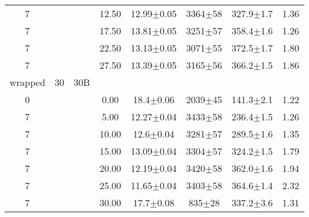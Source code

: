 \begin{tabular}{ccccccc}
7
 &  &  &      12.50 &   12.99$\pm$0.05 &  3364$\pm$58 &  327.9$\pm$1.7 &        1.36 \\
7
 &  &  &      17.50 &   13.81$\pm$0.05 &  3251$\pm$57 &  358.4$\pm$1.6 &        1.26 \\
7
 &  &  &      22.50 &   13.13$\pm$0.05 &  3071$\pm$55 &  372.5$\pm$1.7 &        1.80 \\
7
 &  &  &      27.50 &   13.39$\pm$0.05 &  3165$\pm$56 &  366.2$\pm$1.5 &        1.86 \\
wrapped & 30 & 30B &   &   &   &   & \\
0
 &  &  &       0.00 &    18.4$\pm$0.06 &  2039$\pm$45 &  141.3$\pm$2.1 &        1.22 \\
7
 &  &  &       5.00 &   12.27$\pm$0.04 &  3433$\pm$58 &  236.4$\pm$1.5 &        1.26 \\
7
 &  &  &      10.00 &    12.6$\pm$0.04 &  3281$\pm$57 &  289.5$\pm$1.6 &        1.35 \\
7
 &  &  &      15.00 &   13.09$\pm$0.04 &  3304$\pm$57 &  324.2$\pm$1.5 &        1.79 \\
7
 &  &  &      20.00 &   12.19$\pm$0.04 &  3420$\pm$58 &  362.0$\pm$1.6 &        1.94 \\
7
 &  &  &      25.00 &   11.65$\pm$0.04 &  3403$\pm$58 &  364.6$\pm$1.4 &        2.32 \\
7
 &  &  &      30.00 &    17.7$\pm$0.08 &   835$\pm$28 &  337.2$\pm$3.6 &        1.31 \\
\end{tabular}